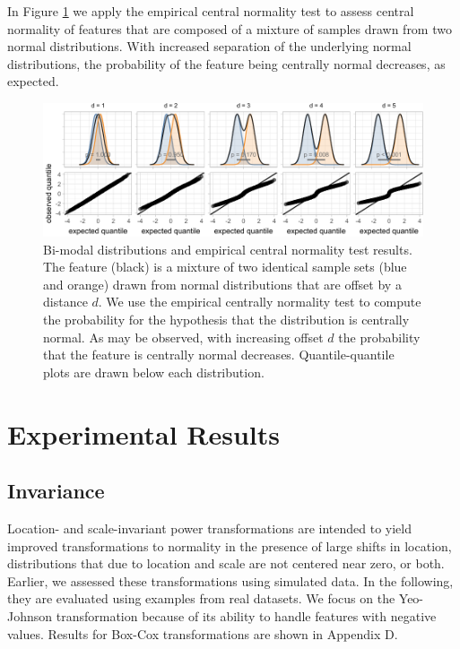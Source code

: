\documentclass[preprint,12pt,authoryear]{elsarticle}
\begin{document}
In Figure \ref{fig:empirical-central-normality-examples} we apply the
empirical central normality test to assess central normality of features
that are composed of a mixture of samples drawn from two normal
distributions. With increased separation of the underlying normal
distributions, the probability of the feature being centrally normal
decreases, as expected.

\begin{figure}

{\centering \includegraphics{figure_7} 

}

\caption{Bi-modal distributions and empirical central normality test results. The feature (black) is a mixture of two identical sample sets (blue and orange) drawn from normal distributions that are offset by a distance $d$. We use the empirical centrally normality test to compute the probability for the hypothesis that the distribution is centrally normal. As may be observed, with increasing offset $d$ the probability that the feature is centrally normal decreases. Quantile-quantile plots are drawn below each distribution.}\label{fig:empirical-central-normality-examples}
\end{figure}

\section{Experimental Results}\label{experimental-results}

\subsection{Invariance}\label{invariance}

Location- and scale-invariant power transformations are intended to
yield improved transformations to normality in the presence of large
shifts in location, distributions that due to location and scale are not
centered near zero, or both. Earlier, we assessed these transformations
using simulated data. In the following, they are evaluated using
examples from real datasets. We focus on the Yeo-Johnson transformation
because of its ability to handle features with negative values. Results
for Box-Cox transformations are shown in Appendix D.
\end{document}
